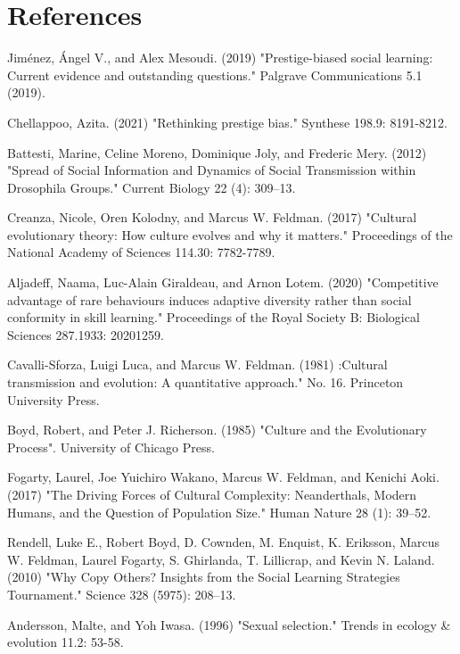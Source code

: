 \documentclass[12pt]{extarticle}
\begin{document}
\section*{References}
\nolinenumbers
\begin{thebibliography}{}


Jiménez, Ángel V., and Alex Mesoudi. (2019) "Prestige-biased social learning: Current evidence and outstanding questions." Palgrave Communications 5.1 (2019).

Chellappoo, Azita. (2021) "Rethinking prestige bias." Synthese 198.9: 8191-8212.

Battesti, Marine, Celine Moreno, Dominique Joly, and Frederic Mery. (2012) "Spread of Social Information and Dynamics of Social Transmission within Drosophila Groups." Current Biology 22 (4): 309–13. 

Creanza, Nicole, Oren Kolodny, and Marcus W. Feldman. (2017) "Cultural evolutionary theory: How culture evolves and why it matters." Proceedings of the National Academy of Sciences 114.30: 7782-7789.

Aljadeff, Naama, Luc-Alain Giraldeau, and Arnon Lotem. (2020) "Competitive advantage of rare behaviours induces adaptive diversity rather than social conformity in skill learning." Proceedings of the Royal Society B: Biological Sciences 287.1933: 20201259.

Cavalli-Sforza, Luigi Luca, and Marcus W. Feldman. (1981) :Cultural transmission and evolution: A quantitative approach." No. 16. Princeton University Press.

Boyd, Robert, and Peter J. Richerson. (1985) "Culture and the Evolutionary Process". University of Chicago Press.

Fogarty, Laurel, Joe Yuichiro Wakano, Marcus W. Feldman, and Kenichi Aoki. (2017) "The Driving Forces of Cultural Complexity: Neanderthals, Modern Humans, and the Question of Population Size." Human Nature 28 (1): 39–52.

Rendell, Luke E., Robert Boyd, D. Cownden, M. Enquist, K. Eriksson, Marcus W. Feldman, Laurel Fogarty, S. Ghirlanda, T. Lillicrap, and Kevin N. Laland. (2010) "Why Copy Others? Insights from the Social Learning Strategies Tournament." Science 328 (5975): 208–13.

Andersson, Malte, and Yoh Iwasa. (1996) "Sexual selection." Trends in ecology \& evolution 11.2: 53-58.


\end{thebibliography}
\end{document}

